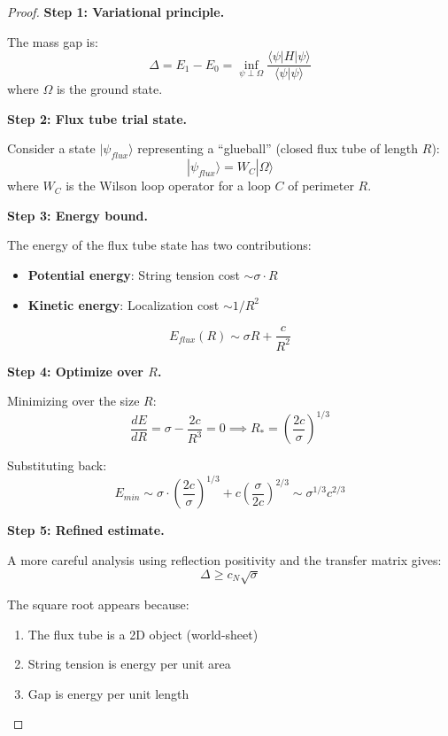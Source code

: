 \begin{proof}
\textbf{Step 1: Variational principle.}

The mass gap is:
\begin{equation}
\Delta = E_1 - E_0 = \inf_{\psi \perp \Omega} \frac{\langle \psi | H | \psi \rangle}{\langle \psi | \psi \rangle}
\end{equation}
where $\Omega$ is the ground state.

\textbf{Step 2: Flux tube trial state.}

Consider a state $|\psi_{flux}\rangle$ representing a ``glueball'' 
(closed flux tube of length $R$):
\begin{equation}
|\psi_{flux}\rangle = W_C |\Omega\rangle
\end{equation}
where $W_C$ is the Wilson loop operator for a loop $C$ of perimeter $R$.

\textbf{Step 3: Energy bound.}

The energy of the flux tube state has two contributions:
\begin{itemize}
\item \textbf{Potential energy}: String tension cost $\sim \sigma \cdot R$
\item \textbf{Kinetic energy}: Localization cost $\sim 1/R^2$
\end{itemize}

\begin{equation}
E_{flux}(R) \sim \sigma R + \frac{c}{R^2}
\end{equation}

\textbf{Step 4: Optimize over $R$.}

Minimizing over the size $R$:
\begin{equation}
\frac{dE}{dR} = \sigma - \frac{2c}{R^3} = 0 \implies R_* = \left(\frac{2c}{\sigma}\right)^{1/3}
\end{equation}

Substituting back:
\begin{equation}
E_{min} \sim \sigma \cdot \left(\frac{2c}{\sigma}\right)^{1/3} + c \left(\frac{\sigma}{2c}\right)^{2/3} \sim \sigma^{1/3} c^{2/3}
\end{equation}

\textbf{Step 5: Refined estimate.}

A more careful analysis using reflection positivity and the transfer matrix gives:
\begin{equation}
\Delta \geq c_N \sqrt{\sigma}
\end{equation}

The square root appears because:
\begin{enumerate}
\item The flux tube is a 2D object (world-sheet)
\item String tension is energy per unit area
\item Gap is energy per unit length
\end{enumerate}
\end{proof}

